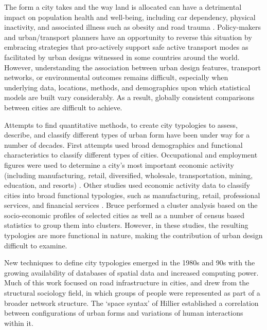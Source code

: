 \documentclass[10pt,letterpaper]{article}
\begin{document}
The form a city takes and the way land is allocated can have a detrimental impact on population health and well-being, including car dependency, physical inactivity, and associated illness such as obesity and road trauma \cite{Giles-corti2016,Kleinert2016,Goenka2016,Zapata-Diomedi2017,Heesch2014,Daley2011, Cepeda2016,MingWen2008,Norman2006,Thompson2018b}. Policy-makers and urban/transport planners have an opportunity to reverse this situation by embracing strategies that pro-actively support safe active transport modes as facilitated by urban designs witnessed in some countries around the world. However, understanding the association between urban design features, transport networks, or environmental outcomes remains difficult, especially when underlying data, locations, methods, and demographics upon which statistical models are built vary considerably. As a result, globally consistent comparisons between cities are difficult to achieve. 

Attempts to find quantitative methods, to create city typologies to assess, describe, and classify different types of urban form have been under way for a number of decades. First attempts used broad demographics and functional characteristics to classify different types of cities. Occupational and employment figures were used to determine a city's most important economic activity (including manufacturing, retail, diversified, wholesale, transportation, mining, education, and resorts) \cite{Harris1943}. Other studies used economic activity data to classify cities into broad functional typologies, such as manufacturing, retail, professional services, and financial services \cite{Nelson1955}. Bruce \cite{Bruce1971} performed a cluster analysis based on the socio-economic profiles of selected cities as well as a number of census based statistics to group them into clusters. However, in these studies, the resulting typologies are more functional in nature, making the contribution of urban design difficult to examine.

New techniques to define city typologies emerged in the 1980s and 90s with the growing availability of databases of spatial data and increased computing power. Much of this work focused on road infrastructure in cities, and drew from the structural sociology field, in which groups of people were represented as part of a broader network structure. The `space syntax' of Hillier \cite{Hillier1996} established a correlation between configurations of urban forms and variations of human interactions within it. 
\end{document}
